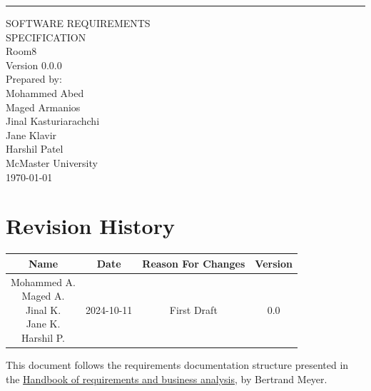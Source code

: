 \documentclass{scrreprt}
\date{}
\def\myversion{0.0.0 }
\theoremstyle{definition}
\begin{document}
\begin{center}
    \rule{16cm}{5pt}\vskip1cm
    \begin{bfseries}
        \Huge{SOFTWARE REQUIREMENTS\\ SPECIFICATION}\\
        \vspace{1.9cm}
        Room8\\
        \vspace{1.9cm}
        \LARGE{Version \myversion}\\
        \vspace{1.9cm}
        Prepared by:\\
        Mohammed Abed\\ 
        Maged Armanios\\
        Jinal Kasturiarachchi\\
        Jane Klavir\\
        Harshil Patel\\
        \vspace{0.9cm}
        McMaster University\\
        \vspace{0.9cm}
        \today\\
    \end{bfseries}
\end{center}

\chapter*{Revision History}

\begin{center}
    \begin{tabular}{|c|c|c|c|}
        \hline
        Name        & Date          & Reason For Changes & Version\\
        \hline
        \hline
        \makecell{Mohammed A. \\ Maged A. \\ Jinal K. \\ Jane K. \\ Harshil P.} & 2024-10-11 & First Draft & 0.0\\
        \hline
    \end{tabular}
\end{center}

This document follows the requirements documentation structure presented in the \href{ https://link.springer.com/content/pdf/10.1007/978-3-031-06739-6.pdf}{Handbook of requirements and business analysis}, by Bertrand Meyer.
\end{document}
